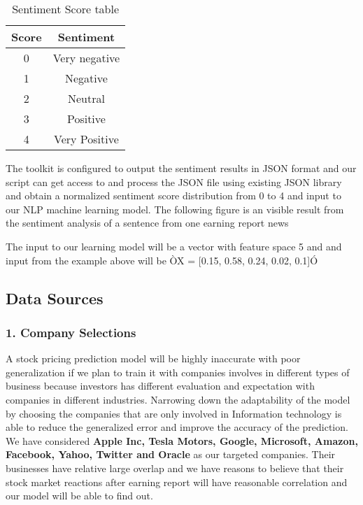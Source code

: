 \documentclass[letterpaper, 10 pt, conference]{ieeeconf}  %
\begin{document}
\begin{table}[h]
\caption{Sentiment Score table}
\label{sentiment score}
\begin{center}
\begin{tabular}{|c|c|}
\hline
Score & Sentiment\\
\hline
0 & Very negative\\
\hline
1 & Negative\\
\hline
2 & Neutral\\
\hline
3 & Positive\\
\hline
4 & Very Positive\\
\hline
\end{tabular}
\end{center}
\end{table}

The toolkit is configured to output the sentiment results in JSON format and our script can get access to and process the JSON file using existing JSON library and obtain a normalized sentiment score distribution from 0 to 4 and input to our NLP machine learning model. The following figure is an visible result from the sentiment analysis of a sentence from one earning report news



The input to our learning model will be a vector with feature space 5 and and input from the example above will be ÒX = [0.15, 0.58, 0.24, 0.02, 0.1]Ó

\subsection{Data Sources}
\subsubsection*{1. Company Selections}
A stock pricing prediction model will be highly inaccurate with poor generalization if we plan to train it with companies involves in different types of business because investors has different evaluation and expectation with companies in different industries. Narrowing down the adaptability of the model by choosing the companies that are only involved in Information technology is able to reduce the generalized error and improve the accuracy of the prediction. We have considered \textbf{Apple Inc, Tesla Motors, Google, Microsoft, Amazon, Facebook, Yahoo, Twitter and Oracle} as our targeted companies. Their businesses have relative large overlap and we have reasons to believe that their stock market reactions after earning report will have reasonable correlation and our model will be able to find out.  
\end{document}
